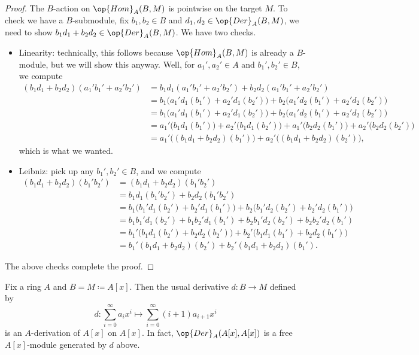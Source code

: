 \documentclass[../notes.tex]{subfiles}
\begin{document}
\begin{proof}
	The $B$-action on $\op{Hom}_A(B,M)$ is pointwise on the target $M$. To check we have a $B$-submodule, fix $b_1,b_2\in B$ and $d_1,d_2\in\op{Der}_A(B,M)$, we need to show $b_1d_1+b_2d_2\in\op{Der}_A(B,M)$. We have two checks.
	\begin{itemize}
		\item Linearity: technically, this follows because $\op{Hom}_A(B,M)$ is already a $B$-module, but we will show this anyway. Well, for $a_1',a_2'\in A$ and $b_1',b_2'\in B$, we compute
		\begin{align*}
			(b_1d_1+b_2d_2)(a_1'b_1'+a_2'b_2') &= b_1d_1(a_1'b_1'+a_2'b_2')+b_2d_2(a_1'b_1'+a_2'b_2') \\
			&= b_1\big(a_1'd_1(b_1')+a_2'd_1(b_2')\big)+b_2\big(a_1'd_2(b_1')+a_2'd_2(b_2')\big) \\
			&= b_1\big(a_1'd_1(b_1')+a_2'd_1(b_2')\big)+b_2\big(a_1'd_2(b_1')+a_2'd_2(b_2')\big) \\
			&= a_1'\big(b_1d_1(b_1')\big)+a_2'\big(b_1d_1(b_2')\big)+a_1'\big(b_2d_2(b_1')\big)+a_2'\big(b_2d_2(b_2')\big) \\
			&= a_1'\big((b_1d_1+b_2d_2)(b_1')\big)+a_2'\big((b_1d_1+b_2d_2)(b_2')\big),
		\end{align*}
		which is what we wanted.
		\item Leibniz: pick up any $b_1',b_2'\in B$, and we compute
		\begin{align*}
			(b_1d_1+b_2d_2)(b_1'b_2') &= (b_1d_1+b_2d_2)(b_1'b_2') \\
			&= b_1d_1(b_1'b_2')+b_2d_2(b_1'b_2') \\
			&= b_1\big(b_1'd_1(b_2')+b_2'd_1(b_1')\big)+b_2\big(b_1'd_2(b_2')+b_2'd_2(b_1')\big) \\
			&= b_1b_1'd_1(b_2')+b_1b_2'd_1(b_1')+b_2b_1'd_2(b_2')+b_2b_2'd_2(b_1') \\
			&= b_1'\big(b_1d_1(b_2')+b_2d_2(b_2')\big)+b_2'\big(b_1d_1(b_1')+b_2d_2(b_1')\big) \\
			&= b_1'(b_1d_1+b_2d_2)(b_2')+b_2'(b_1d_1+b_2d_2)(b_1').
		\end{align*}
	\end{itemize}
	The above checks complete the proof.
\end{proof}
\begin{exe}
	Fix a ring $A$ and $B=M\coloneqq A[x]$. Then the usual derivative $d\colon B\to M$ defined by
	\[d\colon\sum_{i=0}^\infty a_ix^i\mapsto\sum_{i=0}^\infty (i+1)a_{i+1}x^i\]
	is an $A$-derivation of $A[x]$ on $A[x]$. In fact, $\op{Der}_A(A[x],A[x])$ is a free $A[x]$-module generated by $d$ above.
\end{exe}
\end{document}
